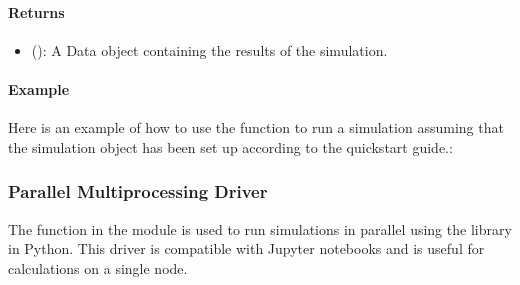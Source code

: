 \documentclass[letterpaper,10pt,english]{sphinxmanual}
\begin{document}
\paragraph{Returns}
\label{\detokenize{user_guide/drivers/serial_driver:returns}}\begin{itemize}
\item {} 
\sphinxAtStartPar
{} (): A Data object containing the results of the simulation.

\end{itemize}


\paragraph{Example}
\label{\detokenize{user_guide/drivers/serial_driver:example}}
\sphinxAtStartPar
Here is an example of how to use the  function to run a simulation assuming
that the simulation object has been set up according to the quickstart guide.:

\begin{sphinxVerbatim}[commandchars=\\\{\}]
   

  
\end{sphinxVerbatim}

\sphinxstepscope


\subsubsection{Parallel Multiprocessing Driver}
\label{\detokenize{user_guide/drivers/parallel_driver_multiprocessing:parallel-multiprocessing-driver}}\label{\detokenize{user_guide/drivers/parallel_driver_multiprocessing:parallel-driver-multiprocessing}}\label{\detokenize{user_guide/drivers/parallel_driver_multiprocessing::doc}}
\sphinxAtStartPar
The  function in the  module is used to run simulations in parallel
using the  library in Python. This driver is compatible with Jupyter notebooks and is useful for
calculations on a single node.
\end{document}
